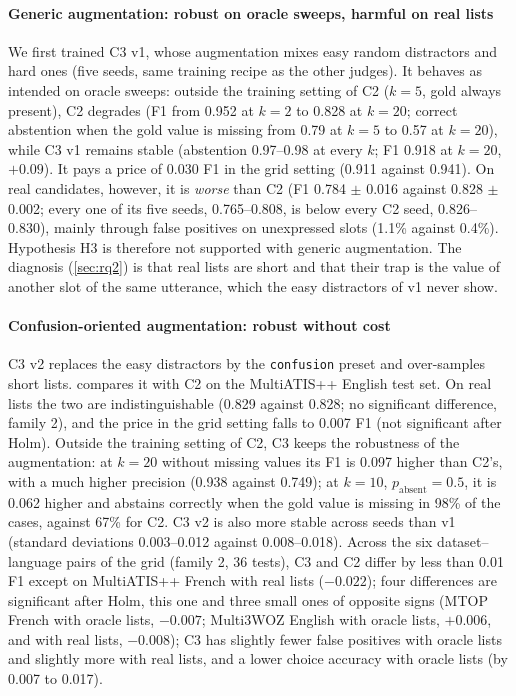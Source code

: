 \paragraph{Generic augmentation: robust on oracle sweeps, harmful on real lists} We first trained C3 v1, whose augmentation mixes easy random distractors and hard ones (five seeds, same training recipe as the other judges). It behaves as intended on oracle sweeps: outside the training setting of C2 ($k=5$, gold always present), C2 degrades (F1 from 0.952 at $k=2$ to 0.828 at $k=20$; correct abstention when the gold value is missing from 0.79 at $k=5$ to 0.57 at $k=20$), while C3 v1 remains stable (abstention 0.97--0.98 at every $k$; F1 0.918 at $k=20$, $+0.09$). It pays a price of 0.030 F1 in the grid setting (0.911 against 0.941). On real candidates, however, it is \emph{worse} than C2 (F1 0.784 $\pm$ 0.016 against 0.828 $\pm$ 0.002; every one of its five seeds, 0.765--0.808, is below every C2 seed, 0.826--0.830), mainly through false positives on unexpressed slots (1.1\% against 0.4\%). Hypothesis H3 is therefore not supported with generic augmentation. The diagnosis (\cref{sec:rq2}) is that real lists are short and that their trap is the value of another slot of the same utterance, which the easy distractors of v1 never show.

\paragraph{Confusion-oriented augmentation: robust without cost} C3 v2 replaces the easy distractors by the \texttt{confusion} preset and over-samples short lists.  compares it with C2 on the MultiATIS++ English test set. On real lists the two are indistinguishable (0.829 against 0.828; no significant difference, family 2), and the price in the grid setting falls to 0.007 F1 (not significant after Holm). Outside the training setting of C2, C3 keeps the robustness of the augmentation: at $k=20$ without missing values its F1 is 0.097 higher than C2's, with a much higher precision (0.938 against 0.749); at $k=10$, $p_{\text{absent}}=0.5$, it is 0.062 higher and abstains correctly when the gold value is missing in 98\% of the cases, against 67\% for C2. C3 v2 is also more stable across seeds than v1 (standard deviations 0.003--0.012 against 0.008--0.018). Across the six dataset--language pairs of the grid (family 2, 36 tests), C3 and C2 differ by less than 0.01 F1 except on MultiATIS++ French with real lists ($-0.022$); four differences are significant after Holm, this one and three small ones of opposite signs (MTOP French with oracle lists, $-0.007$; Multi3WOZ English with oracle lists, $+0.006$, and with real lists, $-0.008$); C3 has slightly fewer false positives with oracle lists and slightly more with real lists, and a lower choice accuracy with oracle lists (by 0.007 to 0.017).

